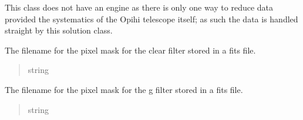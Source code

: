 \documentclass[letterpaper,11pt,english]{sphinxmanual}
\begin{document}
\begin{savenotes}
\begin{fulllineitems}
\sphinxAtStartPar
This class does not have an engine as there is only one way to reduce data
provided the systematics of the Opihi telescope itself; as such the
data is handled straight by this solution class.

\begin{savenotes}\begin{fulllineitems}
\label{\detokenize{code/opihiexarata.opihi.preprocess:opihiexarata.opihi.preprocess.OpihiPreprocessSolution._mask_c_fits_filename}}
\pysigstartsignatures
{}
\pysigstopsignatures
\sphinxAtStartPar
The filename for the pixel mask for the clear filter stored in a
fits file.
\begin{quote}\begin{description}
\sphinxAtStartPar
string

\end{description}\end{quote}

\end{fulllineitems}\end{savenotes}


\begin{savenotes}\begin{fulllineitems}
\label{\detokenize{code/opihiexarata.opihi.preprocess:opihiexarata.opihi.preprocess.OpihiPreprocessSolution._mask_g_fits_filename}}
\pysigstartsignatures
{}
\pysigstopsignatures
\sphinxAtStartPar
The filename for the pixel mask for the g filter stored in a
fits file.
\begin{quote}\begin{description}
\sphinxAtStartPar
string

\end{description}\end{quote}

\end{fulllineitems}\end{savenotes}


\end{fulllineitems}
\end{savenotes}
\end{document}
